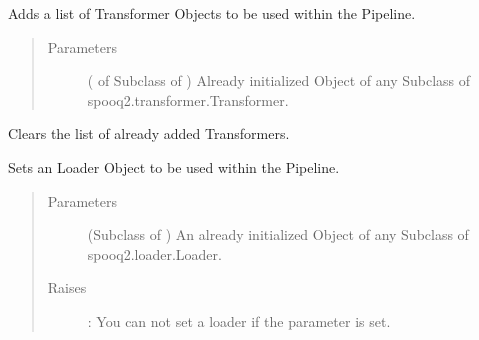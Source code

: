 \documentclass[a4paper,10pt, twoside,english]{sphinxmanual}
\begin{document}
\begin{fulllineitems}
\begin{fulllineitems}
\label{\detokenize{pipeline/pipeline:spooq2.pipeline.pipeline.Pipeline.add_transformers}}
Adds a list of Transformer Objects to be used within the Pipeline.
\begin{quote}\begin{description}
\item[{Parameters}] \leavevmode
{} ( of Subclass of ) \textendash{} Already initialized Object of any Subclass of spooq2.transformer.Transformer.

\end{description}\end{quote}

\end{fulllineitems}


\begin{fulllineitems}
\label{\detokenize{pipeline/pipeline:spooq2.pipeline.pipeline.Pipeline.clear_transformers}}
Clears the list of already added Transformers.

\end{fulllineitems}


\begin{fulllineitems}
\label{\detokenize{pipeline/pipeline:spooq2.pipeline.pipeline.Pipeline.set_loader}}
Sets an Loader Object to be used within the Pipeline.
\begin{quote}\begin{description}
\item[{Parameters}] \leavevmode
{} (Subclass of ) \textendash{} An already initialized Object of any Subclass of spooq2.loader.Loader.

\item[{Raises}] \leavevmode
{}: \textendash{} You can not set a loader if the  parameter is set.

\end{description}\end{quote}

\end{fulllineitems}


\end{fulllineitems}
\end{document}
